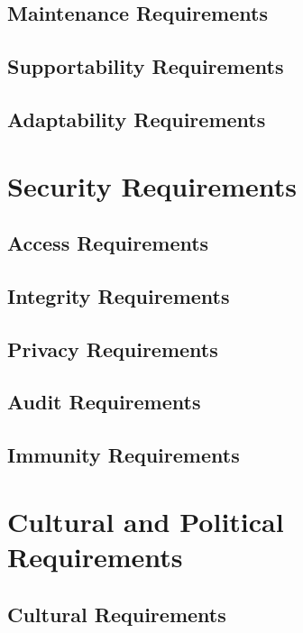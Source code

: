 \documentclass{scrreprt}
\begin{document}
\subsection{Maintenance Requirements}

\subsection{Supportability Requirements}

\subsection{Adaptability Requirements}

\section{Security Requirements}

\subsection{Access Requirements}

\subsection{Integrity Requirements}

\subsection{Privacy Requirements}

\subsection{Audit Requirements}

\subsection{Immunity Requirements}

\section{Cultural and Political Requirements}

\subsection{Cultural Requirements}
\end{document}
